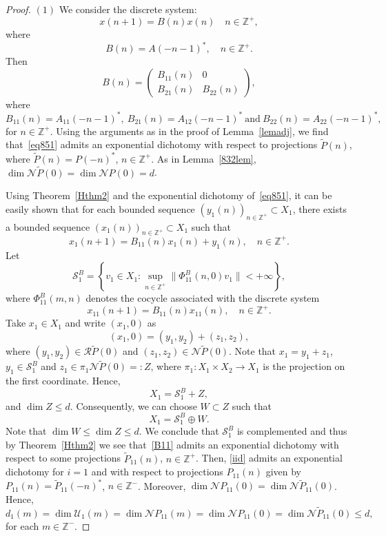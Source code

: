 \documentclass[11pt,reqno,a4paper]{amsart}
\theoremstyle{plain}
\numberwithin{equation}{section}
\theoremstyle{remark}
\def\Z{\mathbb{Z}}
\begin{document}
\begin{proof}
$(1)$ We consider the discrete system:
\begin{equation}\label{eq851}
    x(n+1)=B(n)x(n) \quad n\in \Z^+,
\end{equation}
where 
\begin{equation}\label{555eq}
B(n)=A(-n-1)^*, \quad n\in \Z^+.
\end{equation}
Then 
\[
B(n)=\begin{pmatrix}
B_{11}(n) & 0\\
B_{21}(n) & B_{22}(n)
\end{pmatrix},
\]
where 
\[
B_{11}(n)=A_{11}(-n-1)^*, \ B_{21}(n)=A_{12}(-n-1)^* \ \text{and} \ B_{22}(n)=A_{22}(-n-1)^*,
\]
for $n\in \Z^+$. Using the arguments as in the proof of Lemma~\ref{lemadj}, we find that~\eqref{eq851} admits an exponential dichotomy with respect to projections $\tilde P(n)$, where $\tilde P(n)=P(-n)^*$, $n\in \Z^+$. As in Lemma~\ref{832lem}, $\dim \mathcal N \tilde P(0)=\dim \mathcal N P(0)=d$.

Using Theorem~\ref{Hthm2} and the exponential dichotomy of~\eqref{eq851}, it can be easily shown that for each bounded sequence $(y_1(n))_{n\in \Z^+}\subset X_1$, there exists a bounded sequence $(x_1(n))_{n\in \Z^+}\subset X_1$ such that
\[
x_1(n+1)=B_{11}(n)x_1(n)+y_1(n), \quad n\in \Z^+.
\]
Let 
\begin{equation}\label{602s1}
\mathcal S_1^B=\left \{v_1\in X_1: \sup_{n\in \Z^+}\|\Phi_{11}^B(n, 0)v_1\|<+\infty \right \},
\end{equation}
where $\Phi_{11}^B(m, n)$ denotes the cocycle associated with the discrete system 
\begin{equation}\label{B11}
x_{11}(n+1)=B_{11}(n)x_{11}(n), \quad n\in \Z^+.
\end{equation}
Take $x_1\in X_1$ and write $(x_1, 0)$ as
\[
(x_1, 0)=(y_1, y_2)+(z_1, z_2),
\]
where $(y_1, y_2)\in \mathcal R\tilde P(0)$ and $(z_1, z_2)\in \mathcal N \tilde P(0)$. Note that
$x_1=y_1+z_1$, 
$y_1\in \mathcal S_1^B$ and $z_1 \in \pi_1 \mathcal N \tilde P(0)=:Z$, where $\pi_1\colon X_1\times X_2\to X_1$ is the projection on the first coordinate. Hence, 
\[
X_1=\mathcal S_1^B+Z,
\]
and $\dim Z\le d$. Consequently, we can choose $W\subset Z$ such that
\[
X_1=\mathcal S_1^B\oplus W.
\]
Note that $\dim W \le \dim Z\le d$. We conclude that $\mathcal S_1^B$ is complemented and thus by Theorem~\ref{Hthm2} we see that~\eqref{B11} admits an exponential dichotomy with respect to some projections $\tilde P_{11}(n)$, $n\in \Z^+$. Then, \eqref{iid} admits an exponential dichotomy for $i=1$ and with respect to projections $P_{11}(n)$ given by $P_{11}(n)=\tilde P_{11}(-n)^*$, $n\in \Z^-$. Moreover, $\dim \mathcal NP_{11}(0)=\dim \mathcal N\tilde P_{11}(0)$. Hence,
\[
d_1(m)=\dim \mathcal U_1(m)=\dim \mathcal NP_{11}(m)=\dim \mathcal NP_{11}(0)=\dim \mathcal N\tilde P_{11}(0)\le d,
\]
for each $m\in \Z^-$.


\end{proof}
\end{document}
